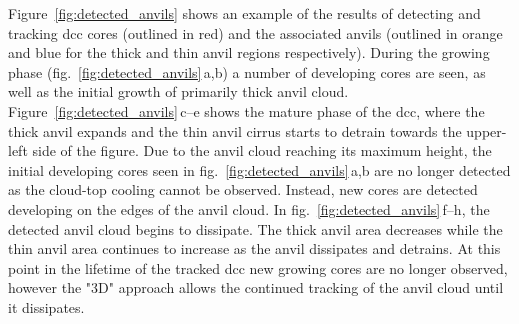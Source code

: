 Figure~\ref{fig:detected_anvils} shows an example of the results of detecting and tracking \acrshort{dcc} cores (outlined in red) and the associated anvils (outlined in orange and blue for the thick and thin anvil regions respectively).
During the growing phase (fig.~\ref{fig:detected_anvils}\,a,b) a number of developing cores are seen, as well as the initial growth of primarily thick anvil cloud.
Figure~\ref{fig:detected_anvils}\,c--e shows the mature phase of the \acrshort{dcc}, where the thick anvil expands and the thin anvil cirrus starts to detrain towards the upper-left side of the figure.
Due to the anvil cloud reaching its maximum height, the initial developing cores seen in fig.~\ref{fig:detected_anvils}\,a,b are no longer detected as the cloud-top cooling cannot be observed.
Instead, new cores are detected developing on the edges of the anvil cloud.
In fig.~\ref{fig:detected_anvils}\,f--h, the detected anvil cloud begins to dissipate.
The thick anvil area decreases while the thin anvil area continues to increase as the anvil dissipates and detrains.
At this point in the lifetime of the tracked \acrshort{dcc} new growing cores are no longer observed, however the "3D" approach allows the continued tracking of the anvil cloud until it dissipates.


